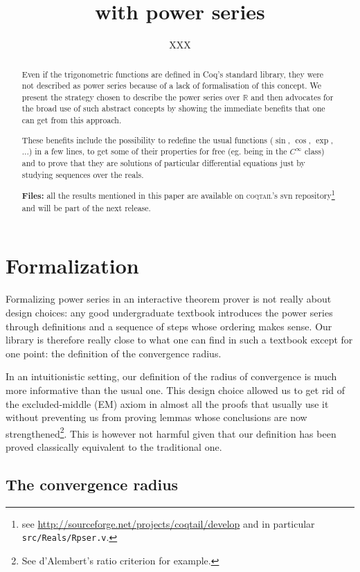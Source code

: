 \documentclass[submission,copyright]{eptcs}
\title{\coq{} with power series}
\author{XXX
\institute{Junior Laboratory \coqtail{}\\
Ens Lyon - France\\}
\email{XXX}}
\newcommand{\coq}{Coq}
\newcommand{\coqtail}{\textsc{coqtail}}
\newcommand{\R}{\mathbb{R}}
\begin{document}
\maketitle

\begin{abstract}
Even if the trigonometric functions are defined in \coq{}'s standard
library, they were not described as power series because of a lack of
formalisation of this concept.
We present the strategy chosen to describe the power series over $\R$
and then advocates for the broad use of such abstract concepts by
showing the immediate benefits that one can get from this approach.

These benefits include the possibility to redefine the usual functions
($\sin$, $\cos$, $\exp$, ...) in a few lines, to get some of their
properties for free (eg. being in the $C^{\infty}$ class) and to prove
that they are solutions of particular differential equations just by
studying sequences over the reals.

\textbf{Files:} all the results mentioned in this paper are available on
\coqtail{}'s svn repository\footnote{see
\url{http://sourceforge.net/projects/coqtail/develop}
and in particular \texttt{src/Reals/Rpser.v}.} and will
be part of the next release.

\end{abstract}

\section{Formalization}

Formalizing power series in an interactive theorem prover is not really
about design choices: any good undergraduate textbook introduces the
power series through definitions and a sequence of steps whose
ordering makes sense. Our library is therefore really close to what one
can find in such a textbook except for one point: the definition of the
convergence radius.

In an intuitionistic setting, our definition of the radius of convergence
is much more informative than the usual one. This design choice allowed
us to get rid of the excluded-middle (EM) axiom in almost all the proofs
that usually use it without preventing us from proving lemmas whose
conclusions are now strengthened\footnote{See d'Alembert's ratio
criterion for example.}. This is however not harmful given that our
definition has been proved classically equivalent to the traditional one.

\subsection{The convergence radius}
\end{document}
